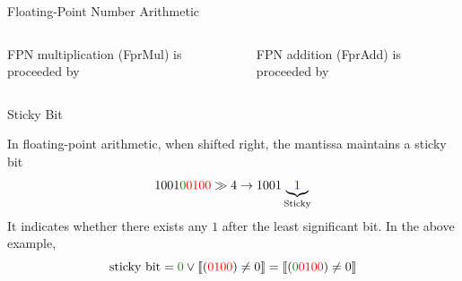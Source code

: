 \begin{frame}{Floating-Point Number Arithmetic}

\begin{columns}[T]
FPN multiplication (FprMul) is proceeded by

FPN addition (FprAdd) is proceeded by


\end{columns}
\medskip

\pause

\end{frame}


\begin{frame}{Sticky Bit}

In floating-point arithmetic, when shifted right, the mantissa maintains a sticky bit
\[
	1001\textcolor{black!50!green}{0}\textcolor{red}{0100} \gg 4 \to 1001\underbrace{\textcolor{blue}{1}}_{\text{Sticky}}
\]
It indicates whether there exists any $1$ after the least significant bit. In the above example,
\[
	\text{sticky bit} = \textcolor{black!50!green}{0} \vee \llbracket (\textcolor{red}{0100}) \neq 0 \rrbracket = \llbracket (\textcolor{black!50!green}{0}\textcolor{red}{0100}) \neq 0 \rrbracket
\]

\end{frame}

